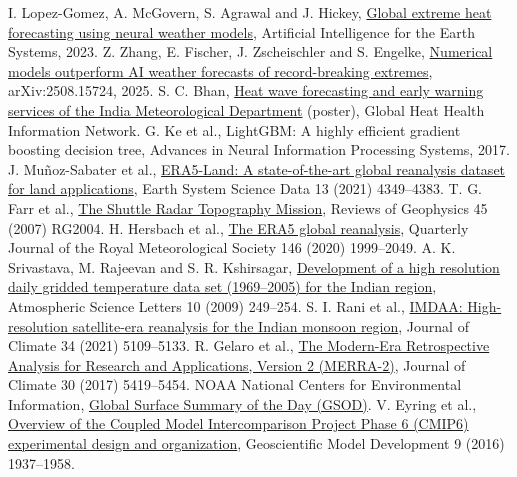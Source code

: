 \documentclass[12pt,a4paper]{report}
\newcommand{\reflink}[2]{\href{#1}{\textcolor{linkblue}{#2}}}
\begin{document}
{\begin{thebibliography}{99}
 I. Lopez-Gomez, A. McGovern, S. Agrawal and J. Hickey, \reflink{https://arxiv.org/abs/2205.10972}{Global extreme heat forecasting using neural weather models}, Artificial Intelligence for the Earth Systems, 2023.
 Z. Zhang, E. Fischer, J. Zscheischler and S. Engelke, \reflink{https://arxiv.org/abs/2508.15724}{Numerical models outperform AI weather forecasts of record-breaking extremes}, arXiv:2508.15724, 2025.
 S. C. Bhan, \reflink{https://heathealth.info/wp-content/uploads/Poster_SC-Bhan_FGFHH-Subhash-Bhan.pdf}{Heat wave forecasting and early warning services of the India Meteorological Department} (poster), Global Heat Health Information Network.
 G. Ke et al., LightGBM: A highly efficient gradient boosting decision tree, Advances in Neural Information Processing Systems, 2017.
 J. Mu\~noz-Sabater et al., \reflink{https://doi.org/10.5194/essd-13-4349-2021}{ERA5-Land: A state-of-the-art global reanalysis dataset for land applications}, Earth System Science Data 13 (2021) 4349--4383.
 T. G. Farr et al., \reflink{https://doi.org/10.1029/2005RG000183}{The Shuttle Radar Topography Mission}, Reviews of Geophysics 45 (2007) RG2004.
 H. Hersbach et al., \reflink{https://doi.org/10.1002/qj.3803}{The ERA5 global reanalysis}, Quarterly Journal of the Royal Meteorological Society 146 (2020) 1999--2049.
 A. K. Srivastava, M. Rajeevan and S. R. Kshirsagar, \reflink{https://doi.org/10.1002/asl.232}{Development of a high resolution daily gridded temperature data set (1969--2005) for the Indian region}, Atmospheric Science Letters 10 (2009) 249--254.
 S. I. Rani et al., \reflink{https://doi.org/10.1175/JCLI-D-20-0412.1}{IMDAA: High-resolution satellite-era reanalysis for the Indian monsoon region}, Journal of Climate 34 (2021) 5109--5133.
 R. Gelaro et al., \reflink{https://doi.org/10.1175/JCLI-D-16-0758.1}{The Modern-Era Retrospective Analysis for Research and Applications, Version 2 (MERRA-2)}, Journal of Climate 30 (2017) 5419--5454.
 NOAA National Centers for Environmental Information, \reflink{https://www.ncei.noaa.gov/access/metadata/landing-page/bin/iso?id=gov.noaa.ncdc:C00516}{Global Surface Summary of the Day (GSOD)}.
 V. Eyring et al., \reflink{https://doi.org/10.5194/gmd-9-1937-2016}{Overview of the Coupled Model Intercomparison Project Phase 6 (CMIP6) experimental design and organization}, Geoscientific Model Development 9 (2016) 1937--1958.

\end{thebibliography}}
\end{document}
